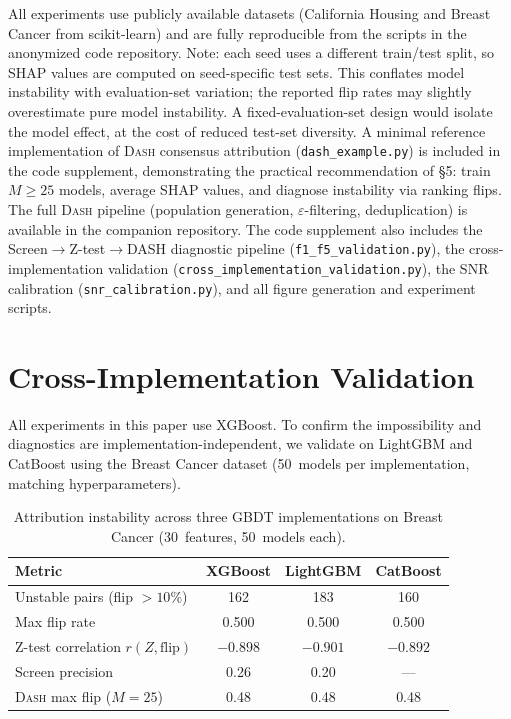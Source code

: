 \documentclass{article}
\newcommand{\DASH}{\textsc{Dash}}
\begin{document}
All experiments use publicly available datasets (California Housing and
Breast Cancer from scikit-learn) and are fully reproducible from the
scripts in the anonymized code repository.
Note: each seed uses a different train/test split, so SHAP values are
computed on seed-specific test sets. This conflates model instability
with evaluation-set variation; the reported flip rates may slightly
overestimate pure model instability. A fixed-evaluation-set design
would isolate the model effect, at the cost of reduced test-set
diversity.
A minimal reference implementation of \DASH{} consensus attribution
(\texttt{dash\_example.py}) is included in the code supplement,
demonstrating the practical recommendation of \S5: train $M \geq 25$
models, average SHAP values, and diagnose instability via ranking flips.
The full \DASH{} pipeline (population generation, $\varepsilon$-filtering,
deduplication) is available in the companion repository.
The code supplement also includes the Screen$\to$Z-test$\to$DASH diagnostic
pipeline (\texttt{f1\_f5\_validation.py}), the cross-implementation
validation (\texttt{cross\_implementation\_validation.py}), the SNR
calibration (\texttt{snr\_calibration.py}), and all figure generation
and experiment scripts.


\section{Cross-Implementation Validation}

All experiments in this paper use XGBoost. To confirm the impossibility
and diagnostics are implementation-independent, we validate on LightGBM
and CatBoost using the Breast Cancer dataset (50~models per
implementation, matching hyperparameters).

\begin{table}[htbp]
\centering
\caption{Attribution instability across three GBDT implementations
on Breast Cancer (30~features, 50~models each).}
\label{tab:cross-impl}
\small
\begin{tabular}{@{}lccc@{}}
\toprule
Metric & XGBoost & LightGBM & CatBoost \\
\midrule
Unstable pairs (flip $> 10\%$) & 162 & 183 & 160 \\
Max flip rate & 0.500 & 0.500 & 0.500 \\
Z-test correlation $r(Z, \text{flip})$ & $-0.898$ & $-0.901$ & $-0.892$ \\
Screen precision & 0.26 & 0.20 & --- \\
\DASH{} max flip ($M{=}25$) & 0.48 & 0.48 & 0.48 \\
\bottomrule
\end{tabular}
\end{table}
\end{document}
